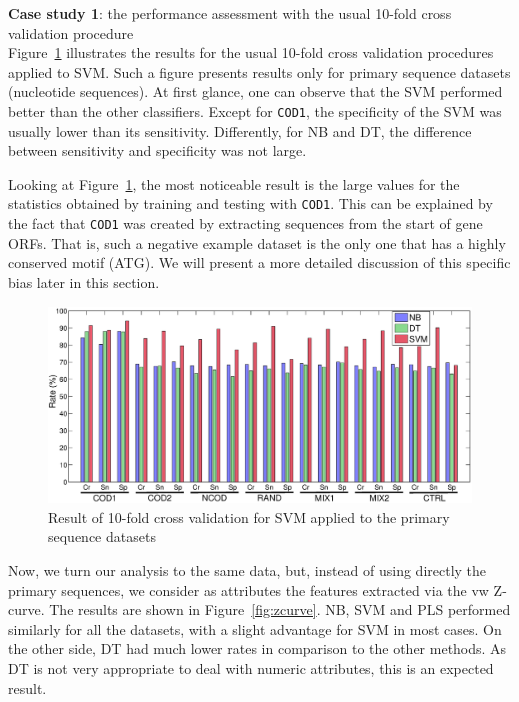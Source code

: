 \documentclass[conference]{IEEEtran}
\begin{document}
\noindent
{\bf Case study 1}: the performance assessment with the usual 10-fold cross validation procedure \\

Figure~\ref{fig:seq} illustrates the results for the usual 10-fold cross validation procedures applied to SVM. Such a figure presents results only for primary sequence datasets (nucleotide sequences). At first glance, one can observe that the SVM performed better than the other classifiers. Except for {\tt COD1}, the specificity of the SVM was usually lower than its sensitivity. Differently, for NB and DT, the difference between sensitivity and specificity was not large.

Looking at Figure~\ref{fig:seq}, the most noticeable result is the large values for the statistics obtained by training and testing with {\tt COD1}. This can be explained by the fact that {\tt COD1} was created by extracting sequences from the start of gene ORFs. That is, such a negative example dataset is the only one that has a highly conserved motif (ATG). We will present a more detailed discussion of this specific bias later in this section. 

\begin{figure}[htp]
\centerline{\includegraphics[width=1.0\textwidth]{Figs/Fig1.eps}} 
\caption{Result of 10-fold cross validation for  SVM applied to the primary sequence datasets}
\label{fig:seq}
\end{figure}

Now, we turn our analysis to the same data, but, instead of using directly the primary sequences, we consider as attributes the features extracted via the vw  Z-curve. The results are shown in Figure~\ref{fig:zcurve}. NB, SVM and PLS performed similarly for all the datasets, with a slight advantage for SVM in most cases. On the other side, DT had much lower rates in comparison to the other methods. As DT is not very appropriate to deal with numeric attributes, this is an expected result.
\end{document}
